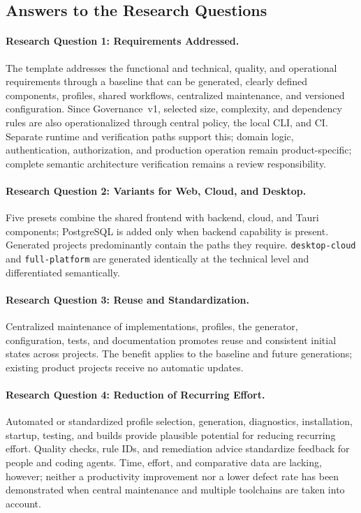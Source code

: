 \subsection{Answers to the Research Questions}
\label{subsec:beantwortung-fragestellungen}

\paragraph{Research Question 1: Requirements Addressed.}
The template addresses the functional and technical, quality, and operational
requirements through a baseline that can be generated, clearly defined
components, profiles, shared workflows, centralized maintenance, and versioned
configuration. Since Governance~v1, selected size, complexity, and dependency
rules are also operationalized through central policy, the local CLI, and CI.
Separate runtime and verification paths support this;
domain logic, authentication, authorization, and production operation remain
product-specific; complete semantic architecture verification remains a review
responsibility.

\paragraph{Research Question 2: Variants for Web, Cloud, and Desktop.}
Five presets combine the shared frontend with backend, cloud, and Tauri
components; PostgreSQL is added only when backend capability is present.
Generated projects predominantly contain the paths they require.
\texttt{desktop-cloud} and \texttt{full-platform} are generated identically
at the technical level and differentiated semantically.

\paragraph{Research Question 3: Reuse and Standardization.}
Centralized maintenance of implementations, profiles, the generator,
configuration, tests, and documentation promotes reuse and consistent initial
states across projects. The benefit applies to the baseline and future
generations; existing product projects receive no automatic updates.

\paragraph{Research Question 4: Reduction of Recurring Effort.}
Automated or standardized profile selection, generation, diagnostics,
installation, startup, testing, and builds provide plausible potential for
reducing recurring effort. Quality checks, rule IDs, and remediation advice
standardize feedback for people and coding agents. Time, effort, and
comparative data are lacking, however; neither a productivity improvement nor
a lower defect rate has been demonstrated when central maintenance and
multiple toolchains are taken into account.

